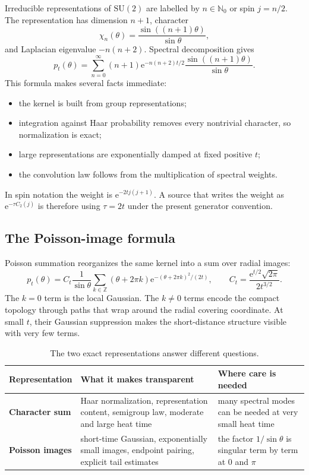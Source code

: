 \documentclass[11pt]{article}
\theoremstyle{definition}
\newcommand{\SU}{\mathrm{SU}(2)}
\newcommand{\e}{\mathrm{e}}
\begin{document}
Irreducible representations of $\SU$ are labelled by
$n\in\mathbb N_0$ or spin $j=n/2$.  The representation has dimension $n+1$,
character
\[
 \chi_n(\theta)=\frac{\sin((n+1)\theta)}{\sin\theta},
\]
and Laplacian eigenvalue $-n(n+2)$.  Spectral decomposition gives
\begin{equation}\label{expl:eq:character}
 p_t(\theta)=\sum_{n=0}^{\infty}(n+1)
 \e^{-n(n+2)t/2}\frac{\sin((n+1)\theta)}{\sin\theta}.
\end{equation}
This formula makes several facts immediate:
\begin{itemize}
\item the kernel is built from group representations;
\item integration against Haar probability removes every nontrivial character,
so normalization is exact;
\item large representations are exponentially damped at fixed positive $t$;
\item the convolution law follows from the multiplication of spectral weights.
\end{itemize}

In spin notation the weight is $\e^{-2t j(j+1)}$.  A source that writes the
weight as $\e^{-\tau C_2(j)}$ is therefore using $\tau=2t$ under the present
generator convention.

\subsection{The Poisson-image formula}

Poisson summation reorganizes the same kernel into a sum over radial images:
\begin{equation}\label{expl:eq:image}
 p_t(\theta)=C_t\frac{1}{\sin\theta}
 \sum_{k\in\mathbb Z}(\theta+2\pi k)
 \e^{-(\theta+2\pi k)^2/(2t)},
 \qquad
 C_t=\frac{\e^{t/2}\sqrt{2\pi}}{2t^{3/2}}.
\end{equation}
The $k=0$ term is the local Gaussian.  The $k\ne0$ terms encode the compact
topology through paths that wrap around the radial covering coordinate.
At small $t$, their Gaussian suppression makes the short-distance structure
visible with very few terms.

\begin{table}[ht]
\centering
\begin{tabularx}{\textwidth}{>{\bfseries}p{}XX}
\toprule
Representation & What it makes transparent & Where care is needed \\
\midrule
Character sum & Haar normalization, representation content, semigroup law,
moderate and large heat time & many spectral modes can be needed at very small
heat time \\
Poisson images & short-time Gaussian, exponentially small images, endpoint
pairing, explicit tail estimates & the factor $1/\sin\theta$ is singular term
by term at $0$ and $\pi$ \\
\bottomrule
\end{tabularx}
\caption{The two exact representations answer different questions.}
\label{expl:tab:representations}
\end{table}
\end{document}
